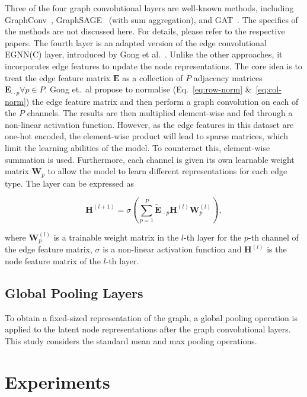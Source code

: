 \documentclass[10pt,conference,compsocconf]{ieee}
\begin{document}
Three of the four graph convolutional layers are well-known methods, including
GraphConv~\cite{graphconv}, GraphSAGE~\cite{graphsage} (with sum aggregation),
and GAT~\cite{gat}. The specifics of the methods are not discussed here. For
details, please refer to the respective papers. The fourth layer is an adapted
version of the edge convolutional EGNN(C) layer, introduced by Gong et
al.~\cite{egnn}. Unlike the other approaches, it incorporates edge features to
update the node representations. The core idea is to treat the edge feature
matrix $\mathbf{E}$ as a collection of $P$ adjacency matrices
$\mathbf{E}_{\cdot\cdot p} \forall p \in P$. Gong et.~al propose to normalise
(Eq.~\ref{eq:row-norm} \&~\ref{eq:col-norm}) the edge feature matrix and then
perform a graph convolution on each of the $P$ channels. The results are then
multiplied element-wise and fed through a non-linear activation function.
However, as the edge features in this dataset are one-hot encoded, the
element-wise product will lead to sparse matrices, which limit the learning
abilities of the model. To counteract this, element-wise summation is used.
Furthermore, each channel is given its own learnable weight matrix
$\mathbf{W}_p$ to allow the model to learn different representations for each
edge type. The layer can be expressed as

\begin{equation}
  \mathbf{H}^{(l+1)} = 
  \sigma\left(
    \sum_{p=1}^P \tilde{\mathbf{E}}_{\cdot\cdot p} \mathbf{H}^{(l)}
    \mathbf{W}^{(l)}_p 
    \right),
\end{equation}

where $\mathbf{W}^{(l)}_p$ is a trainable weight matrix in the $l$-th layer for
the $p$-th channel of the edge feature matrix, $\sigma$ is a non-linear
activation function and $\mathbf{H}^{(l)}$ is the node feature matrix of the
$l$-th layer.


\subsection{Global Pooling Layers}

To obtain a fixed-sized representation of the graph, a global pooling operation
is applied to the latent node representations after the graph convolutional
layers. This study considers the standard mean and max pooling operations.

\section{Experiments}
\end{document}
